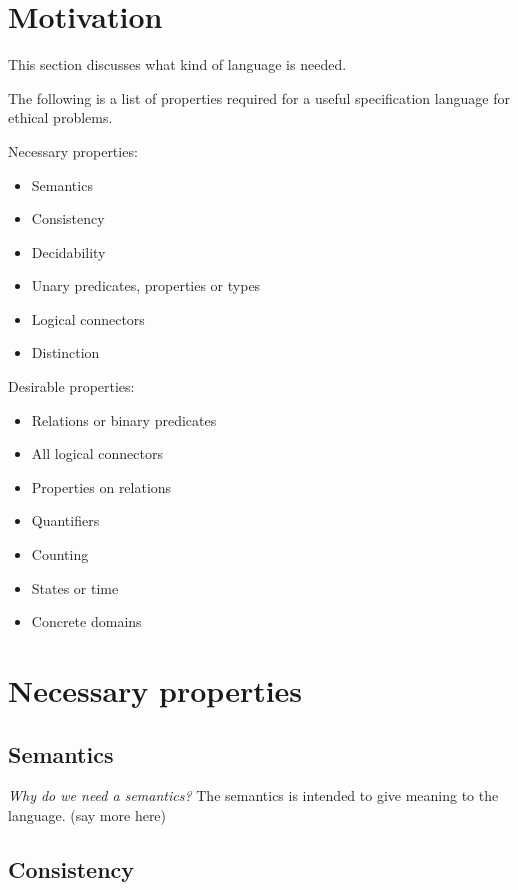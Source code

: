 \section{Motivation}

\newcommand{\question}[1]{\textit{#1}}

\newcommand{\unclear}{{\small{(say more here)}}}

This section discusses what kind of language is needed.

The following is a list of properties required for a useful specification language for ethical problems.

Necessary properties:
\begin{itemize}
    \item Semantics
    \item Consistency
    \item Decidability
    \item Unary predicates, properties or types
    \item Logical connectors
    \item Distinction
\end{itemize}

Desirable properties:
\begin{itemize}
    \item Relations or binary predicates
    \item All logical connectors
    \item Properties on relations
    \item Quantifiers
    \item Counting
    \item States or time
    \item Concrete domains
\end{itemize}


\section{Necessary properties}

\subsection{Semantics}
\question{Why do we need a semantics?}
The semantics is intended to give meaning to the language.
\unclear



\subsection{Consistency}

